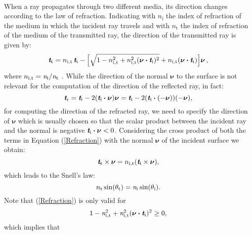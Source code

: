 \\ \indent When a ray propagates through two different media, its direction changes according to the law of refraction. 
Indicating with $n_\textrm{i}$ the index of refraction of the medium in which the incident ray travels and with 
$n_\textrm{t}$ the index of refraction of the medium of the transmitted ray, the direction of the transmitted ray is given by:
\begin{equation}\label{Refraction}
\textit{\textbf{t}}_\textrm{t} = n_{\textrm{i},\textrm{t}}\,\textit{\textbf{t}}_\textrm{i}-
\Big[\sqrt{1-n_{\textrm{i},\textrm{t}}^2+
n_{\textrm{i},\textrm{t}}^2(\boldsymbol{\nu}\boldsymbol{\cdot}\textit{\textbf{t}}_\textrm{i})^2}
+n_{\textrm{i},\textrm{t}}(\boldsymbol{\nu}\boldsymbol{\cdot}\textit{\textbf{t}}_\textrm{i}) \Big]\boldsymbol{\nu}\,,
\end{equation}
where $n_{\textrm{i},\textrm{t}}=\textit{n}_\textrm{i}/\textit{n}_\textrm{t}$ \cite{chaves2015introduction}.
While the direction of the normal $\boldsymbol{\nu}$ to the surface is not relevant for the computation of the direction of the reflected ray, in fact:
\begin{equation}
\textit{\textbf{t}}_\textrm{r} = \textit{\textbf{t}}_\textrm{i}-2(\textit{\textbf{t}}_\textrm{i}\boldsymbol{\cdot}\boldsymbol{\nu})\boldsymbol{\nu}= \textit{\textbf{t}}_\textrm{i}-2(\textit{\textbf{t}}_\textrm{i}\boldsymbol{\cdot}(-\boldsymbol{\nu}))(-\boldsymbol{\nu}), 
\end{equation}
for computing the direction of the refracted ray, we need to specify the direction of $\boldsymbol{\nu}$ which is usually chosen so that the scalar product between the incident ray and the normal is negative $\textit{\textbf{t}}_{\textrm{i}}\boldsymbol{\cdot}\boldsymbol{\nu}<0$. 
Considering the cross product of both the terms in Equation (\ref{Refraction}) with the normal $\boldsymbol{\nu}$ of the incident surface we obtain:
\begin{equation}
\textit{\textbf{t}}_\textrm{t}\times\boldsymbol{\nu} = n_{\textrm{i},\textrm{t}}(\textit{\textbf{t}}_\textrm{i}\times\boldsymbol{\nu}),
\end{equation}
which leads to the Snell's law:
\begin{equation}\label{eq:snell}
n_\textrm{t}\sin(\theta_\textrm{t}) = \textit{n}_\textrm{i}\sin(\theta_\textrm{i}).
\end{equation}
Note that (\ref{Refraction}) is only valid for 
\begin{equation}\label{tir}
1-\textit{n}_{\textrm{i},\textrm{t}}^2+\textit{n}_{\textrm{i},\textrm{t}}^2(\boldsymbol{\nu}\boldsymbol{\cdot}\textit{\textbf{t}}_\textrm{i})^2\geq 0,
\end{equation} which implies that
